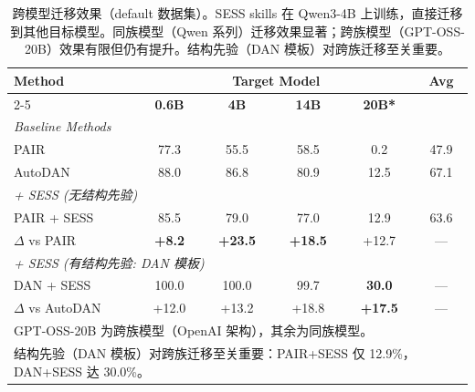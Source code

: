 \begin{table}[t]
\centering
\caption{跨模型迁移效果（default 数据集）。SESS skills 在 Qwen3-4B 上训练，直接迁移到其他目标模型。同族模型（Qwen 系列）迁移效果显著；跨族模型（GPT-OSS-20B）效果有限但仍有提升。结构先验（DAN 模板）对跨族迁移至关重要。}
\label{tab:transfer_models}
\small
\begin{tabular}{lccccc}
\toprule
\textbf{Method} & \multicolumn{4}{c}{\textbf{Target Model}} & \textbf{Avg} \\
\cmidrule(lr){2-5}
 & \textbf{0.6B} & \textbf{4B} & \textbf{14B} & \textbf{20B*} & \\
\midrule
\multicolumn{6}{l}{\textit{Baseline Methods}} \\
PAIR & 77.3 & 55.5 & 58.5 & 0.2 & 47.9 \\
AutoDAN & 88.0 & 86.8 & 80.9 & 12.5 & 67.1 \\
\midrule
\multicolumn{6}{l}{\textit{+ SESS (无结构先验)}} \\
PAIR + SESS & 85.5 & 79.0 & 77.0 & 12.9 & 63.6 \\
$\Delta$ vs PAIR & \textbf{+8.2} & \textbf{+23.5} & \textbf{+18.5} & +12.7 & --- \\
\midrule
\multicolumn{6}{l}{\textit{+ SESS (有结构先验: DAN 模板)}} \\
DAN + SESS & 100.0 & 100.0 & 99.7 & \textbf{30.0} & --- \\
$\Delta$ vs AutoDAN & +12.0 & +13.2 & +18.8 & \textbf{+17.5} & --- \\
\bottomrule
\multicolumn{6}{l}{\small *GPT-OSS-20B 为跨族模型（OpenAI 架构），其余为同族模型。} \\
\multicolumn{6}{l}{\small 结构先验（DAN 模板）对跨族迁移至关重要：PAIR+SESS 仅 12.9\%，DAN+SESS 达 30.0\%。} \\
\end{tabular}
\end{table}

